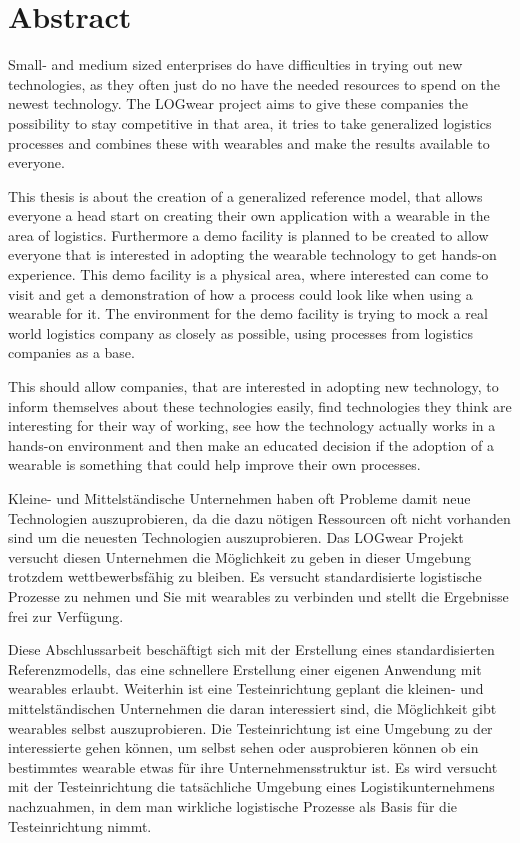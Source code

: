 \chapter*{Abstract}
Small- and medium sized enterprises do have difficulties in trying out new technologies, as they often just do no have the needed resources to spend on the newest technology. The LOGwear project aims to give these companies the possibility to stay competitive in that area, it tries to take generalized logistics processes and combines these with wearables and make the results available to everyone.

This thesis is about the creation of a generalized reference model, that allows everyone a head start on creating their own application with a wearable in the area of logistics. Furthermore a demo facility is planned to be created to allow everyone that is interested  in adopting the wearable technology to get hands-on experience. This demo facility is a physical area, where interested can come to visit and get a demonstration of how a process could look like when using a wearable for it. The environment for the demo facility is trying to mock a real world logistics company as closely as possible, using processes from logistics companies as a base.

This should allow companies, that are interested in adopting new technology, to inform themselves about these technologies easily, find technologies they think are interesting for their way of working, see how the technology actually works in a hands-on environment and then make an educated decision if the adoption of a wearable is something that could help improve their own processes.

\vspace{2cm}

Kleine- und Mittelständische Unternehmen haben oft Probleme damit neue Technologien auszuprobieren, da die dazu nötigen Ressourcen oft nicht vorhanden sind um die neuesten Technologien auszuprobieren. Das LOGwear Projekt versucht diesen Unternehmen die Möglichkeit zu geben in dieser Umgebung trotzdem wettbewerbsfähig zu bleiben. Es versucht standardisierte logistische Prozesse zu nehmen und Sie mit wearables zu verbinden und stellt die Ergebnisse frei zur Verfügung.

Diese Abschlussarbeit beschäftigt sich mit der Erstellung eines standardisierten Referenzmodells, das eine schnellere Erstellung einer eigenen Anwendung mit wearables erlaubt. Weiterhin ist eine Testeinrichtung geplant die kleinen- und mittelständischen Unternehmen die daran interessiert sind, die Möglichkeit gibt  wearables selbst auszuprobieren. Die Testeinrichtung ist eine Umgebung zu der interessierte gehen können, um selbst sehen oder ausprobieren können ob ein bestimmtes wearable etwas für ihre Unternehmensstruktur ist. Es wird versucht mit der Testeinrichtung die tatsächliche Umgebung eines Logistikunternehmens nachzuahmen, in dem man wirkliche logistische Prozesse als Basis für die Testeinrichtung nimmt.

